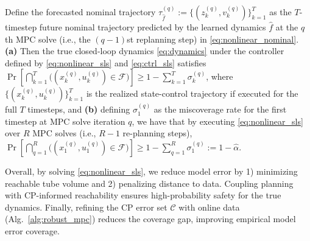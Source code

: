 \documentclass{l4dc2026}
\newcommand{\red}[1]{{\color{red}{#1}}}
\newcommand{\Px}{\bm{\Phi}^{\mathrm{x}}}
\newcommand{\Pu}{\bm{\Phi}^{\mathrm{u}}}
\renewcommand{\red}[1]{{\color{red}{#1}}}
\begin{document}

\vspace{-6pt}
\begin{theorem}\label{cor:rollout_prob}
    Define the forecasted nominal trajectory {\small $\tau_{\hat f}^{(q)} := \{(z_k^{(q)}, v_k^{(q)})\}_{k=1}^{T}$} as the $T$-timestep future nominal trajectory predicted by the learned dynamics {\small$\hat f$} at the $q$th MPC solve (i.e., the $(q-1)$st replanning step) in \eqref{eq:nonlinear_nominal}. \textbf{(a)} Then the true closed-loop dynamics \eqref{eq:dynamics} under the controller defined by \eqref{eq:nonlinear_sls} and \eqref{eq:ctrl_sls} satisfies {\small $\Pr[\bigcap_{k=1}^T \big((x_k^{(q)}, u_k^{(q)})\in \mathcal{F}\big)] \geq 1 - \sum_{k=1}^{T}\sigma_k^{(q)}$}, where {\small $\{(x_k^{(q)}, u_k^{(q)})\}_{k=1}^T$} is the realized state-control trajectory if executed for the full $T$ timesteps, and \textbf{(b)} defining $\sigma_1^{(q)}$ as the miscoverage rate for the first timestep at MPC solve iteration $q$, we have that by executing \eqref{eq:nonlinear_sls} over $R$ MPC solves (i.e., $R-1$ re-planning steps), {\small $\Pr[\bigcap_{q=1}^R\big((x_1^{(q)}, u_1^{(q)})\in \mathcal{F}\big)] \geq 1 - \sum_{q=1}^{R}\sigma^{(q)}_1 := 1-\hat \alpha$}. 
\end{theorem}
\vspace{-4pt}
\noindent Overall, by solving \eqref{eq:nonlinear_sls}, we reduce model error by 1) minimizing reachable tube volume and 2) penalizing distance to data. Coupling planning with CP-informed reachability ensures high-probability safety for the true dynamics. Finally, refining the CP error set $\mathcal{C}$ with online data (Alg.~\ref{alg:robust_mpc}) reduces the coverage gap, improving empirical model error coverage.
\end{document}
